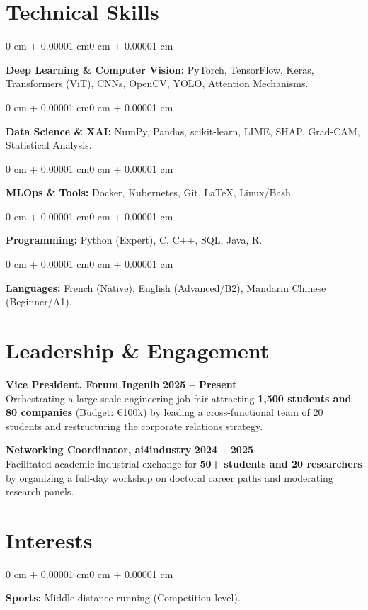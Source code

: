 \documentclass[10pt, letterpaper]{article}
\newenvironment{onecolentry}{
    \begin{adjustwidth}{0 cm + 0.00001 cm}{0 cm + 0.00001 cm}
}{
    \end{adjustwidth}
}
\begin{document}
    \section{Technical Skills}
    \begin{onecolentry}
        \textbf{Deep Learning \& Computer Vision:} PyTorch, TensorFlow, Keras, Transformers (ViT), CNNs, OpenCV, YOLO, Attention Mechanisms.
    \end{onecolentry}
    \begin{onecolentry}
        \textbf{Data Science \& XAI:} NumPy, Pandas, scikit-learn, LIME, SHAP, Grad-CAM, Statistical Analysis.
    \end{onecolentry}
    \begin{onecolentry}
        \textbf{MLOps \& Tools:} Docker, Kubernetes, Git, LaTeX, Linux/Bash.
    \end{onecolentry}
    \begin{onecolentry}
        \textbf{Programming:} Python (Expert), C, C++, SQL, Java, R.
    \end{onecolentry}
    \begin{onecolentry}
        \textbf{Languages:} French (Native), English (Advanced/B2), Mandarin Chinese (Beginner/A1).
    \end{onecolentry}

    \section{Leadership \& Engagement}
    
    \textbf{Vice President, Forum Ingenib} \hfill \textbf{2025 -- Present} \\
    Orchestrating a large-scale engineering job fair attracting \textbf{1,500 students and 80 companies} (Budget: €100k) by leading a cross-functional team of 20 students and restructuring the corporate relations strategy.

    \vspace{0.1cm}
    
    \textbf{Networking Coordinator, ai4industry} \hfill \textbf{2024 -- 2025} \\
    Facilitated academic-industrial exchange for \textbf{50+ students and 20 researchers} by organizing a full-day workshop on doctoral career paths and moderating research panels.

    \section{Interests}
    \begin{onecolentry}
        \textbf{Sports:} Middle-distance running (Competition level).
    \end{onecolentry}
\end{document}
